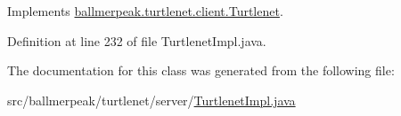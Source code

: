 Implements \hyperlink{interfaceballmerpeak_1_1turtlenet_1_1client_1_1Turtlenet_a169f35c3f487d0282c9cca1c69ef0864}{ballmerpeak.\-turtlenet.\-client.\-Turtlenet}.



Definition at line 232 of file Turtlenet\-Impl.\-java.



The documentation for this class was generated from the following file\-:\begin{DoxyCompactItemize}
\item 
src/ballmerpeak/turtlenet/server/\hyperlink{TurtlenetImpl_8java}{Turtlenet\-Impl.\-java}\end{DoxyCompactItemize}
